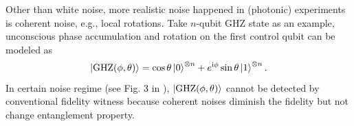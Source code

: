 \documentclass[
aps,
pra,
twocolumn,
floatfix,
]{revtex4-2}
\theoremstyle{plain}
\theoremstyle{definition}
\newcommand{\ghz}{\text{GHZ}}
\begin{document}
Other than white noise, more realistic noise happened in (photonic) experiments is coherent noise, e.g., local rotations.
Take $n$-qubit GHZ state as an example, unconscious phase accumulation and 
rotation on the first control qubit can be modeled as 
\cite{zhouEntanglementDetectionCoherent2020}
\begin{equation}
	\ket{\ghz(\phi,\theta)}=
	\cos\theta\ket{0}^{\otimes n}+e^{\ii \phi}\sin\theta\ket{1}^{\otimes n}.
	\label{eq:coherent_noise}
\end{equation}
In certain noise regime (see Fig. 3 in \cite{zhouEntanglementDetectionCoherent2020}), $\ket{\ghz(\phi,\theta)}$ cannot be detected by conventional fidelity witness because coherent noises diminish the fidelity but not change entanglement property.
\end{document}
